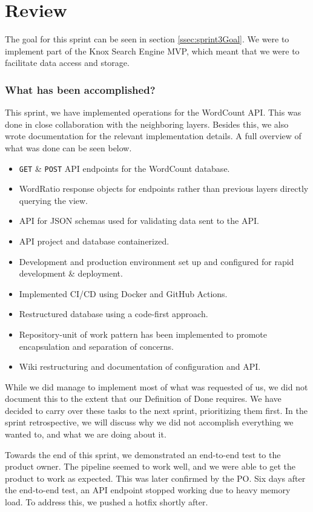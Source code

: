 \section{Review}
The goal for this sprint can be seen in section \ref{ssec:sprint3Goal}. We were to implement part of the Knox Search Engine MVP, which meant that we were to facilitate data access and storage.

\subsubsection{What has been accomplished?}
This sprint, we have implemented operations for the WordCount API. This was done in close collaboration with the neighboring layers. 
Besides this, we also wrote documentation for the relevant implementation details. A full overview of what was done can be seen below.

\begin{itemize}
    \item \texttt{GET} \& \texttt{POST} API endpoints for the WordCount database.
    \item WordRatio response objects for endpoints rather than previous layers directly querying the view.
    \item API for JSON schemas used for validating data sent to the API.
    \item API project and database containerized.
    \item Development and production environment set up and configured for rapid development \& deployment.
    \item Implemented CI/CD using Docker and GitHub Actions.
    \item Restructured database using a code-first approach.
    \item Repository-unit of work pattern has been implemented to promote encapsulation and separation of concerns.
    \item Wiki restructuring and documentation of configuration and API.
\end{itemize}

While we did manage to implement most of what was requested of us, we did not document this to the extent that our Definition of Done requires. 
We have decided to carry over these tasks to the next sprint, prioritizing them first. In the sprint retrospective, we will discuss why we did not accomplish everything we wanted to, and what we are doing about it.

Towards the end of this sprint, we demonstrated an end-to-end test to the \knox{} product owner. The pipeline seemed to work well, and we were able to get the product to work as expected. This was later confirmed by the PO. 
Six days after the end-to-end test, an API endpoint stopped working due to heavy memory load. 
To address this, we pushed a hotfix shortly after.

